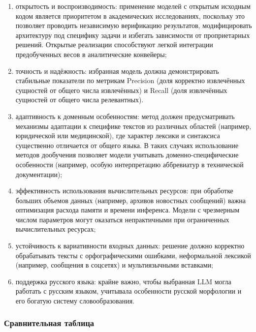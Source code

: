 \begin{enumerate}
    \item открытость и воспроизводимость:
    применение моделей с открытым исходным кодом является приоритетом в академических исследованиях, поскольку это позволяет проводить независимую верификацию результатов, модифицировать архитектуру под специфику задачи и избегать зависимости от проприетарных решений. Открытые реализации способствуют легкой интеграции предобученных весов в аналитические конвейеры;

    \item точность и надёжность:  
    избранная модель должна демонстрировать стабильные показатели по метрикам Precision (доля корректно извлечённых сущностей от общего числа извлечённых) и Recall (доля извлечённых сущностей от общего числа релевантных).

    \item адаптивность к доменным особенностям:
    метод должен предусматривать механизмы адаптации к специфике текстов из различных областей (например, юридической или медицинской), где характер лексики и синтаксиса существенно отличается от общего языка. В таких случаях использование методов дообучения позволяет модели учитывать доменно-специфические особенности (например, особую интерпретацию аббревиатур в технической документации);

    \item эффективность использования вычислительных ресурсов:
    при обработке больших объемов данных (например, архивов новостных сообщений) важна оптимизация расхода памяти и времени инференса. Модели с чрезмерным числом параметров могут оказаться непрактичными при ограниченных вычислительных ресурсах;

    \item устойчивость к вариативности входных данных:
    решение должно корректно обрабатывать тексты с орфографическими ошибками, неформальной лексикой (например, сообщения в соцсетях) и мультиязычными вставками;

    \item поддержка русского языка:
    крайне важно, чтобы выбранная LLM могла работать с русским языком, учитывала особенности русской морфологии и его богатую систему словообразования. 
\end{enumerate}

\subsubsection{Сравнительная таблица}

